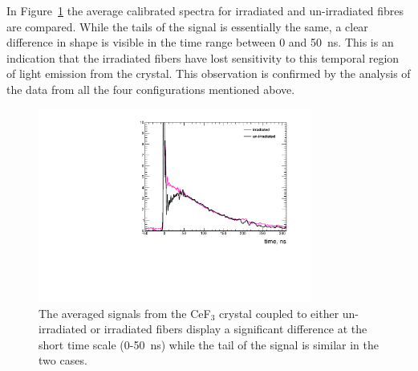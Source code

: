 \documentclass[a4paper,11pt]{article}
\begin{document}
In Figure~\ref{fig:CeF3shapeComparison} the average calibrated spectra for irradiated and un-irradiated fibres are compared. While the tails of the signal is essentially the same, a clear difference in shape is visible in the time range between 0 and 50~ns. This is an indication that the irradiated fibers have lost sensitivity to this temporal region of light emission from the crystal. This observation is confirmed by the analysis of the data from all the four configurations mentioned above.
\begin{figure}[ht]
\begin{center}
        \includegraphics[width=9cm]{Figures/CeF3coupledFibresShapeComparison.pdf}
    \caption{\small The averaged signals from the CeF$_3$ crystal coupled to either un-irradiated or irradiated fibers display a significant difference at the short time scale (0-50~ns) while the tail of the signal is similar in the two cases.}
    \label{fig:CeF3shapeComparison}
\end{center}
\end{figure}
\end{document}
